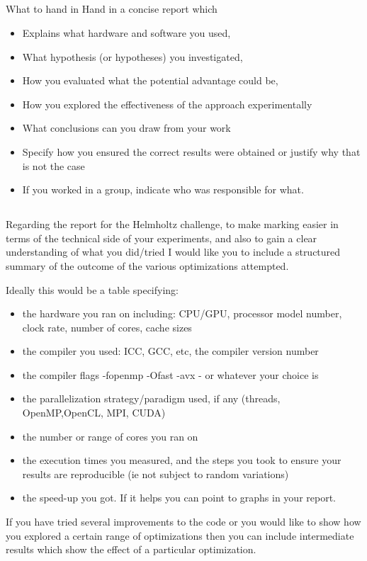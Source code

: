 \documentclass[11pt, oneside, a4paper]{article}
\begin{document}
\subsection{} %
\label{sub:}


What to hand in Hand in a concise report which
\begin{itemize}
\item  Explains what hardware and software you used,
\item  What hypothesis (or hypotheses) you investigated,
\item  How you evaluated what the potential advantage could be,
\item  How you explored the effectiveness of the approach experimentally
\item  What conclusions can you draw from your work
\item  Specify how you ensured the correct results were obtained or justify why that is not the case
\item  If you worked in a group, indicate who was responsible for what.
\end{itemize}

\subsection{} %
\label{sub:}


Regarding the report for the Helmholtz challenge, to make marking easier in terms of the technical side of your experiments, and also to gain a clear understanding of what you did/tried I would like you to include a structured summary of the outcome of the various optimizations attempted.

Ideally this would be a table specifying:
\begin{itemize}
\item  the hardware you ran on including: CPU/GPU, processor model number, clock rate, number of cores, cache sizes
\item  the compiler you used: ICC, GCC, etc, the compiler version number
\item  the compiler flags -fopenmp -Ofast -avx  - or whatever your choice is
\item  the parallelization strategy/paradigm used, if any (threads, OpenMP,OpenCL, MPI, CUDA)
\item  the number or range of cores you ran on
\item  the execution times you measured, and the steps you took to ensure your results are reproducible (ie not subject to random variations)
\item  the speed-up you got. If it helps you can point to graphs in your report.
\end{itemize}
If you have tried several improvements to the code or you would like to show how you explored a certain range of optimizations then you can include intermediate results which show the effect of a particular optimization.
\end{document}
